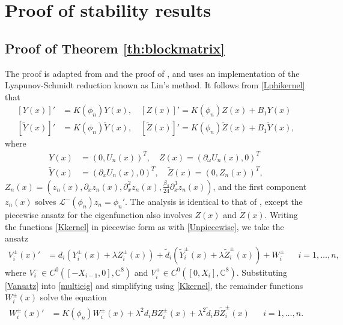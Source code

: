 \documentclass[12pt]{elsarticle}
\def\C{{\mathbb C}}
\def\calL{{\mathcal L}}
\begin{document}
\section{Proof of stability results}

\subsection{Proof of Theorem \ref{th:blockmatrix}}\label{sec:blockmatrixproof}

The proof is adapted from \cite[Section 3.4]{Manukian} and the proof of \cite[Theorem 2]{Sandstede1998}, and uses an implementation of the Lyapunov-Schmidt reduction known as Lin's method. It follows from \cref{Lphikernel} that
\begin{equation}\label{Kkernel}
\begin{aligned}
[Y(x)]' &= K(\phi_n)Y(x), \quad [Z(x)]' = K(\phi_n)Z(x) + B_1 Y(x) \\
[\tilde{Y}(x)]' &= K(\phi_n)\tilde{Y}(x), \quad [\tilde{Z}(x)]' = K(\phi_n)\tilde{Z}(x) + B_1 \tilde{Y}(x),
\end{aligned}
\end{equation}
where
\begin{equation}
\begin{aligned}
Y(x) &= ( 0, U_n(x) )^T, \quad
Z(x) = ( \partial_\omega U_n(x), 0 )^T \\
\tilde{Y}(x) &= ( \partial_x U_n(x), 0)^T, \quad
\tilde{Z}(x) = ( 0, Z_n(x) )^T,
\end{aligned}
\end{equation}
$Z_n(x) = (z_n(x), \partial_x z_n(x), \partial_x^2 z_n(x), \frac{\beta_4}{24} \partial_x^3 z_n(x))$, and the first component $z_n(x)$ solves $\calL^-(\phi_n)z_n = \phi_n'$. The analysis is identical to that of \cite{Manukian}, except the piecewise ansatz for the eigenfunction also involves $Z(x)$ and $\tilde{Z}(x)$. Writing the functions \cref{Kkernel} in piecewise form as with \cref{Unpiecewise}, we take the ansatz
\begin{align}\label{Vansatz}
V_i^\pm(x)' &= d_i(Y_i^\pm(x) + \lambda Z_i^\pm(x)) + \tilde{d}_i(\tilde{Y}_i^\pm(x) + \lambda \tilde{Z}_i^\pm(x)) + W_i^\pm && i = 1, \dots, n,
\end{align}
where $V_i^- \in C^0( [-X_{i-1}, 0], \C^8 )$ and $V_i^+ \in C^0( [0, X_i], \C^8 )$. Substituting \cref{Vansatz} into \cref{multieig} and simplifying using \cref{Kkernel}, the remainder functions $W_i^\pm(x)$ solve the equation
\begin{align}\label{Wsolves}
W_i^\pm(x)' &= K(\phi_n)W_i^\pm(x) + \lambda^2 d_i B Z_i^\pm(x) + \lambda^2 \tilde{d}_i B \tilde{Z}_i^\pm(x) && i = 1, \dots, n.
\end{align}
\end{document}
